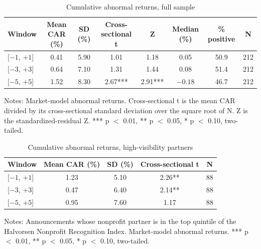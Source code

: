 \documentclass[11pt]{article}
\begin{document}
\begin{table}[h!]
\centering
\begin{threeparttable}
\caption{Cumulative abnormal returns, full sample}
\small
\begin{tabular}{lccccccc}
\toprule
Window & Mean CAR (\%) & SD (\%) & Cross-sectional t & Z & Median (\%) & \% positive & N \\
\midrule
{[}$-1$, $+1${]} & 0.41 & 5.90 & 1.01 & 1.18 & 0.05 & 50.9 & 212 \\
{[}$-3$, $+3${]} & 0.64 & 7.10 & 1.31 & 1.44 & 0.08 & 51.4 & 212 \\
{[}$-5$, $+5${]} & 1.52 & 8.30 & 2.67*** & 2.91*** & $-0.18$ & 46.7 & 212 \\
\bottomrule
\end{tabular}
\begin{tablenotes}\footnotesize
\item Notes: Market-model abnormal returns. Cross-sectional t is the mean CAR divided by its cross-sectional standard deviation over the square root of N. Z is the standardized-residual Z. *** p $<$ 0.01, ** p $<$ 0.05, * p $<$ 0.10, two-tailed.
\end{tablenotes}
\end{threeparttable}
\end{table}

\begin{table}[h!]
\centering
\begin{threeparttable}
\caption{Cumulative abnormal returns, high-visibility partners}
\small
\begin{tabular}{lcccc}
\toprule
Window & Mean CAR (\%) & SD (\%) & Cross-sectional t & N \\
\midrule
{[}$-1$, $+1${]} & 1.23 & 5.10 & 2.26** & 88 \\
{[}$-3$, $+3${]} & 0.47 & 6.40 & 2.14** & 88 \\
{[}$-5$, $+5${]} & 0.95 & 7.60 & 1.17 & 88 \\
\bottomrule
\end{tabular}
\begin{tablenotes}\footnotesize
\item Notes: Announcements whose nonprofit partner is in the top quintile of the Halvorsen Nonprofit Recognition Index. Market-model abnormal returns. *** p $<$ 0.01, ** p $<$ 0.05, * p $<$ 0.10, two-tailed.
\end{tablenotes}
\end{threeparttable}
\end{table}
\end{document}
